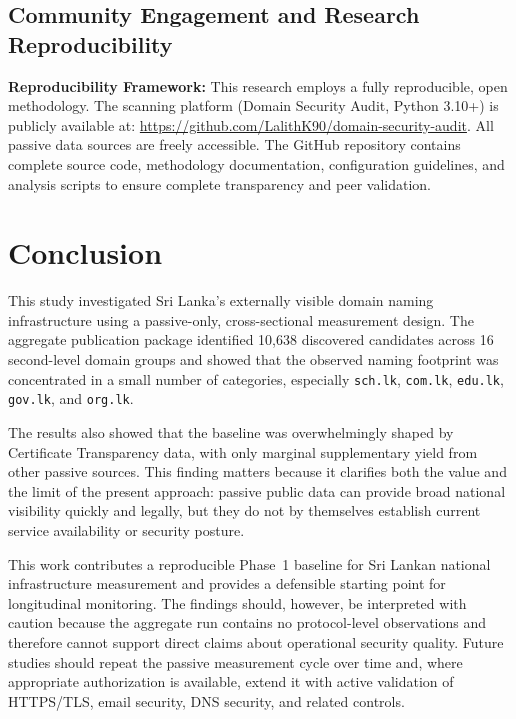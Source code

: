 \documentclass[preprint,review,12pt]{elsarticle}
\begin{document}
\subsection{Community Engagement and Research Reproducibility}

\textbf{Reproducibility Framework:} This research employs a fully reproducible, open methodology. The scanning platform (Domain Security Audit, Python 3.10+) is publicly available at: \url{https://github.com/LalithK90/domain-security-audit}. All passive data sources are freely accessible. The GitHub repository contains complete source code, methodology documentation, configuration guidelines, and analysis scripts to ensure complete transparency and peer validation.

\section{Conclusion}
\label{sec:conclusion}

This study investigated Sri Lanka's externally visible domain naming infrastructure using a passive-only, cross-sectional measurement design. The aggregate publication package identified 10,638 discovered candidates across 16 second-level domain groups and showed that the observed naming footprint was concentrated in a small number of categories, especially \texttt{sch.lk}, \texttt{com.lk}, \texttt{edu.lk}, \texttt{gov.lk}, and \texttt{org.lk}.

The results also showed that the baseline was overwhelmingly shaped by Certificate Transparency data, with only marginal supplementary yield from other passive sources. This finding matters because it clarifies both the value and the limit of the present approach: passive public data can provide broad national visibility quickly and legally, but they do not by themselves establish current service availability or security posture.

This work contributes a reproducible Phase~1 baseline for Sri Lankan national infrastructure measurement and provides a defensible starting point for longitudinal monitoring. The findings should, however, be interpreted with caution because the aggregate run contains no protocol-level observations and therefore cannot support direct claims about operational security quality. Future studies should repeat the passive measurement cycle over time and, where appropriate authorization is available, extend it with active validation of HTTPS/TLS, email security, DNS security, and related controls.
\end{document}

